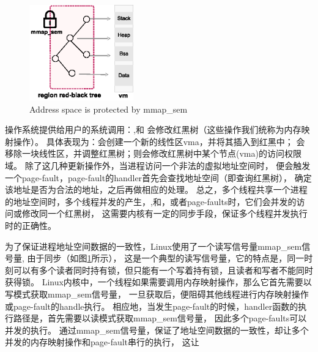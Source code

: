 \begin{figure}[!h!t]  
	\centering
	\includegraphics[width=0.40\textwidth]{eps/mmap_sem.eps}
	\caption{Address space is protected by mmap\_sem}
	\label{fig:mmap:sem}
\end{figure}


操作系统提供给用户的系统调用：,和
会修改红黑树（这些操作我们统称为内存映射操作）。
具体表现为：会创建一个新的线性区vma，并将其插入到红黑中；
会移除一块线性区，并调整红黑树；则会修改红黑树中某个节点(vma)的访问权限域。
除了这几种更新操作外，当进程访问一个非法的虚拟地址空间时，
便会触发一个page-fault，page-fault的handler首先会查找地址空间（即查询红黑树），
确定该地址是否为合法的地址，之后再做相应的处理。
总之，多个线程共享一个进程的地址空间时，多个线程并发的产生，,和，或者page-faults时，它们会并发的访问或修改同一个红黑树，
这需要内核有一定的同步手段，保证多个线程并发执行时的正确性。

为了保证进程地址空间数据的一致性，Linux使用了一个读写信号量mmap\_sem信号量,
由于同步（如图\ref{fig:mmap:sem}所示），
这是一个典型的读写信号量，它的特点是，同一时刻可以有多个读者同时持有锁，但只能有一个写着持有锁，且读者和写者不能同时获得锁。
Linux内核中，一个线程如果需要调用内存映射操作，那么它首先需要以写模式获取mmap\_sem信号量，
一旦获取后，便阻碍其他线程进行内存映射操作或page-fault的handle执行。
相应地，当发生page-fault的时候，handler函数的执行路径是，首先需要以读模式获取mmap\_sem信号量，
因此多个page-faults可以并发的执行。
通过mmap\_sem信号量，保证了地址空间数据的一致性，却让多个并发的内存映射操作和page-fault串行的执行，
这让






